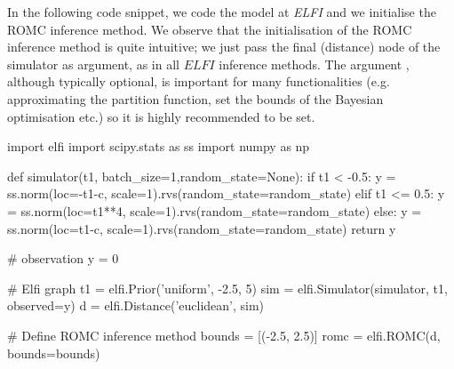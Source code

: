 In the following code snippet, we code the model at \textit{ELFI} and
we initialise the ROMC inference method. We observe that the
initialisation of the ROMC inference method is quite intuitive; we
just pass the final (distance) node of the simulator as argument, as
in all $\textit{ELFI}$ inference methods. The argument
, although typically optional, is important for many
functionalities (e.g. approximating the partition function, set the
bounds of the Bayesian optimisation etc.) so it is highly recommended
to be set.

\begin{pythoncode}
  import elfi
  import scipy.stats as ss
  import numpy as np
  
  def simulator(t1, batch_size=1,random_state=None):
      if t1 < -0.5:
          y = ss.norm(loc=-t1-c, scale=1).rvs(random_state=random_state)
      elif t1 <= 0.5:
          y = ss.norm(loc=t1**4, scale=1).rvs(random_state=random_state)
      else:
          y = ss.norm(loc=t1-c, scale=1).rvs(random_state=random_state)
      return y

  # observation
  y = 0
      
  # Elfi graph    
  t1 = elfi.Prior('uniform', -2.5, 5)
  sim = elfi.Simulator(simulator, t1, observed=y)
  d = elfi.Distance('euclidean', sim)

  # Define ROMC inference method
  bounds = [(-2.5, 2.5)]
  romc = elfi.ROMC(d, bounds=bounds)
\end{pythoncode}


